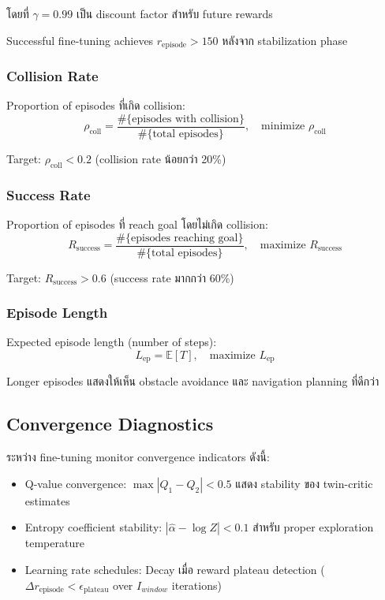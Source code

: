 \documentclass[10pt,a4paper,twocolumn]{article}
\begin{document}
โดยที่ $\gamma=0.99$ เป็น discount factor สำหรับ future rewards

Successful fine-tuning achieves $r_{\text{episode}} > 150$ หลังจาก stabilization phase

\subsubsection{Collision Rate}
Proportion of episodes ที่เกิด collision:
\begin{equation}\label{eq:collision-rate}
    \rho_{\text{coll}} = \frac{\#\{\text{episodes with collision}\}}{\#\{\text{total episodes}\}}, \quad \text{minimize } \rho_{\text{coll}}
\end{equation}

Target: $\rho_{\text{coll}} < 0.2$ (collision rate น้อยกว่า 20\%)

\subsubsection{Success Rate}
Proportion of episodes ที่ reach goal โดยไม่เกิด collision:
\begin{equation}\label{eq:success-rate}
    R_{\text{success}} = \frac{\#\{\text{episodes reaching goal}\}}{\#\{\text{total episodes}\}}, \quad \text{maximize } R_{\text{success}}
\end{equation}

Target: $R_{\text{success}} > 0.6$ (success rate มากกว่า 60\%)

\subsubsection{Episode Length}
Expected episode length (number of steps):
\begin{equation}\label{eq:episode-length}
    L_{\text{ep}} = \mathbb{E}[T], \quad \text{maximize } L_{\text{ep}}
\end{equation}

Longer episodes แสดงให้เห็น obstacle avoidance และ navigation planning ที่ดีกว่า

\subsection{Convergence Diagnostics}

ระหว่าง fine-tuning monitor convergence indicators ดังนี้:
\begin{itemize}
    \item Q-value convergence: $\max|Q_1 - Q_2| < 0.5$ แสดง stability ของ twin-critic estimates
    
    \item Entropy coefficient stability: $|\hat{\alpha} - \log Z| < 0.1$ สำหรับ proper exploration temperature
    
    \item Learning rate schedules: Decay เมื่อ reward plateau detection ($\Delta r_{\text{episode}} < \epsilon_{\text{plateau}}$ over $I_{window}$ iterations)
\end{itemize}
\end{document}
